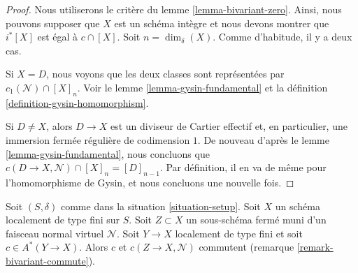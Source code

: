 \begin{proof}
Nous utiliserons le critère du lemme \ref{lemma-bivariant-zero}.
Ainsi, nous pouvons supposer que $X$ est un schéma intègre et
nous devons montrer que $i^*[X]$ est égal à $c \cap [X]$.
Soit $n = \dim_\delta(X)$. Comme d'habitude, il y a deux cas.

\medskip\noindent
Si $X = D$, nous voyons que les deux classes sont représentées par
$c_1(\mathcal{N}) \cap [X]_n$. Voir le lemme \ref{lemma-gysin-fundamental}
et la définition \ref{definition-gysin-homomorphism}.

\medskip\noindent
Si $D \not = X$, alors $D \to X$ est un diviseur de Cartier effectif
et, en particulier, une immersion fermée régulière de codimension $1$.
De nouveau d'après le lemme \ref{lemma-gysin-fundamental}, nous concluons que
$c(D \to X, \mathcal{N}) \cap [X]_n = [D]_{n - 1}$. Par définition, il en va
de même pour l'homomorphisme de Gysin, et nous concluons
une nouvelle fois.
\end{proof}

\begin{lemma}
\label{lemma-gysin-commutes}
Soit $(S, \delta)$ comme dans la situation \ref{situation-setup}. Soit $X$ un schéma
localement de type fini sur $S$. Soit $Z \subset X$ un sous-schéma fermé
muni d'un faisceau normal virtuel $\mathcal{N}$. Soit $Y \to X$ localement de
type fini et soit $c \in A^*(Y \to X)$. Alors $c$ et $c(Z \to X, \mathcal{N})$
commutent (remarque \ref{remark-bivariant-commute}).
\end{lemma}

